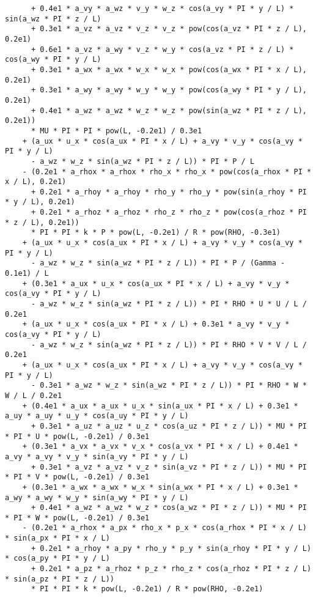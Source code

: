 \documentclass[10pt]{article}
\begin{document}
\begin{small}
\begin{verbatim}
      + 0.4e1 * a_vy * a_wz * v_y * w_z * cos(a_vy * PI * y / L) * sin(a_wz * PI * z / L)
      + 0.3e1 * a_vz * a_vz * v_z * v_z * pow(cos(a_vz * PI * z / L), 0.2e1)
      + 0.6e1 * a_vz * a_wy * v_z * w_y * cos(a_vz * PI * z / L) * cos(a_wy * PI * y / L)
      + 0.3e1 * a_wx * a_wx * w_x * w_x * pow(cos(a_wx * PI * x / L), 0.2e1)
      + 0.3e1 * a_wy * a_wy * w_y * w_y * pow(cos(a_wy * PI * y / L), 0.2e1)
      + 0.4e1 * a_wz * a_wz * w_z * w_z * pow(sin(a_wz * PI * z / L), 0.2e1))
      * MU * PI * PI * pow(L, -0.2e1) / 0.3e1
    + (a_ux * u_x * cos(a_ux * PI * x / L) + a_vy * v_y * cos(a_vy * PI * y / L)
      - a_wz * w_z * sin(a_wz * PI * z / L)) * PI * P / L
    - (0.2e1 * a_rhox * a_rhox * rho_x * rho_x * pow(cos(a_rhox * PI * x / L), 0.2e1)
      + 0.2e1 * a_rhoy * a_rhoy * rho_y * rho_y * pow(sin(a_rhoy * PI * y / L), 0.2e1) 
      + 0.2e1 * a_rhoz * a_rhoz * rho_z * rho_z * pow(cos(a_rhoz * PI * z / L), 0.2e1))
      * PI * PI * k * P * pow(L, -0.2e1) / R * pow(RHO, -0.3e1)
    + (a_ux * u_x * cos(a_ux * PI * x / L) + a_vy * v_y * cos(a_vy * PI * y / L)
      - a_wz * w_z * sin(a_wz * PI * z / L)) * PI * P / (Gamma - 0.1e1) / L
    + (0.3e1 * a_ux * u_x * cos(a_ux * PI * x / L) + a_vy * v_y * cos(a_vy * PI * y / L)
      - a_wz * w_z * sin(a_wz * PI * z / L)) * PI * RHO * U * U / L / 0.2e1
    + (a_ux * u_x * cos(a_ux * PI * x / L) + 0.3e1 * a_vy * v_y * cos(a_vy * PI * y / L)
      - a_wz * w_z * sin(a_wz * PI * z / L)) * PI * RHO * V * V / L / 0.2e1
    + (a_ux * u_x * cos(a_ux * PI * x / L) + a_vy * v_y * cos(a_vy * PI * y / L)
      - 0.3e1 * a_wz * w_z * sin(a_wz * PI * z / L)) * PI * RHO * W * W / L / 0.2e1
    + (0.4e1 * a_ux * a_ux * u_x * sin(a_ux * PI * x / L) + 0.3e1 * a_uy * a_uy * u_y * cos(a_uy * PI * y / L)
      + 0.3e1 * a_uz * a_uz * u_z * cos(a_uz * PI * z / L)) * MU * PI * PI * U * pow(L, -0.2e1) / 0.3e1
    + (0.3e1 * a_vx * a_vx * v_x * cos(a_vx * PI * x / L) + 0.4e1 * a_vy * a_vy * v_y * sin(a_vy * PI * y / L)
      + 0.3e1 * a_vz * a_vz * v_z * sin(a_vz * PI * z / L)) * MU * PI * PI * V * pow(L, -0.2e1) / 0.3e1
    + (0.3e1 * a_wx * a_wx * w_x * sin(a_wx * PI * x / L) + 0.3e1 * a_wy * a_wy * w_y * sin(a_wy * PI * y / L)
      + 0.4e1 * a_wz * a_wz * w_z * cos(a_wz * PI * z / L)) * MU * PI * PI * W * pow(L, -0.2e1) / 0.3e1
    - (0.2e1 * a_rhox * a_px * rho_x * p_x * cos(a_rhox * PI * x / L) * sin(a_px * PI * x / L)
      + 0.2e1 * a_rhoy * a_py * rho_y * p_y * sin(a_rhoy * PI * y / L) * cos(a_py * PI * y / L)
      + 0.2e1 * a_pz * a_rhoz * p_z * rho_z * cos(a_rhoz * PI * z / L) * sin(a_pz * PI * z / L))
      * PI * PI * k * pow(L, -0.2e1) / R * pow(RHO, -0.2e1)

\end{verbatim}
\end{small}
\end{document}
